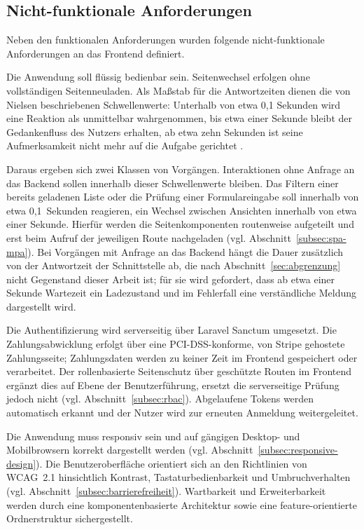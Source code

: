 \subsection{Nicht-funktionale Anforderungen}
\label{subsec:nichtfunktionale-anforderungen}

Neben den funktionalen Anforderungen wurden folgende
nicht-funktionale Anforderungen an das Frontend definiert.

Die Anwendung soll flüssig bedienbar sein. Seitenwechsel erfolgen
ohne vollständigen Seitenneuladen. Als Maßstab für die Antwortzeiten dienen die von Nielsen beschriebenen
Schwellenwerte: Unterhalb von etwa 0,1 Sekunden wird eine Reaktion als
unmittelbar wahrgenommen, bis etwa einer Sekunde bleibt der
Gedankenfluss des Nutzers erhalten, ab etwa zehn Sekunden ist seine
Aufmerksamkeit nicht mehr auf die Aufgabe gerichtet
\cite{nielsen_response_times}.
 
Daraus ergeben sich zwei Klassen von Vorgängen. Interaktionen ohne Anfrage an das Backend sollen innerhalb dieser
Schwellenwerte bleiben. Das Filtern einer bereits geladenen Liste oder
die Prüfung einer Formulareingabe soll innerhalb von etwa
0,1~Sekunden reagieren, ein Wechsel zwischen Ansichten innerhalb von
etwa einer Sekunde. Hierfür werden die Seitenkomponenten routenweise aufgeteilt und erst
beim Aufruf der jeweiligen Route nachgeladen (vgl.
Abschnitt~\ref{subsec:spa-mpa}). Bei Vorgängen mit Anfrage an
das Backend hängt die Dauer zusätzlich von der Antwortzeit der
Schnittstelle ab, die nach Abschnitt~\ref{sec:abgrenzung} nicht
Gegenstand dieser Arbeit ist; für sie wird gefordert, dass ab etwa
einer Sekunde Wartezeit ein Ladezustand und im Fehlerfall eine
verständliche Meldung dargestellt wird.

Die Authentifizierung wird serverseitig über Laravel Sanctum
umgesetzt. Die Zahlungsabwicklung erfolgt über eine
\acs{PCI-DSS}-konforme, von Stripe gehostete Zahlungsseite;
Zahlungsdaten werden zu keiner Zeit im Frontend gespeichert oder
verarbeitet. Der rollenbasierte Seitenschutz über geschützte Routen im
Frontend ergänzt dies auf Ebene der Benutzerführung, ersetzt die
serverseitige Prüfung jedoch nicht (vgl.
Abschnitt~\ref{subsec:rbac}). Abgelaufene Tokens werden automatisch
erkannt und der Nutzer wird zur erneuten Anmeldung weitergeleitet.

Die Anwendung muss responsiv sein und auf gängigen Desktop- und
Mobilbrowsern korrekt dargestellt werden (vgl.
Abschnitt~\ref{subsec:responsive-design}). Die Benutzeroberfläche
orientiert sich an den Richtlinien von \acs{WCAG}~2.1 hinsichtlich
Kontrast, Tastaturbedienbarkeit und Umbruchverhalten (vgl.
Abschnitt~\ref{subsec:barrierefreiheit}). Wartbarkeit und
Erweiterbarkeit werden durch eine komponentenbasierte Architektur
sowie eine feature-orientierte Ordnerstruktur sichergestellt.

